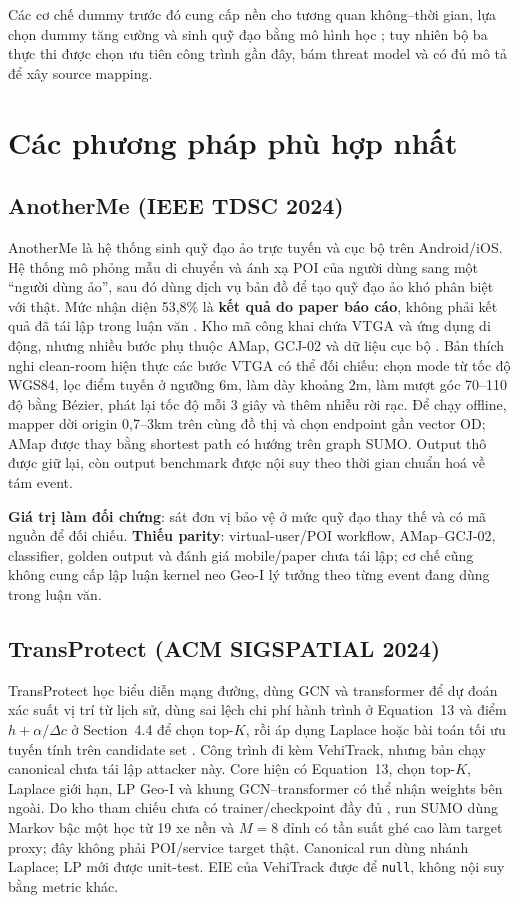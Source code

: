 \documentclass[12pt,a4paper,oneside]{report}
\begin{document}
Các cơ chế dummy trước đó cung cấp nền cho tương quan không--thời gian, lựa chọn dummy tăng cường và sinh quỹ đạo bằng mô hình học \citep{liu2017dummy,parmar2023dummy,yang2023gan}; tuy nhiên bộ ba thực thi được chọn ưu tiên công trình gần đây, bám threat model và có đủ mô tả để xây source mapping.

\section{Các phương pháp phù hợp nhất}

\subsection{AnotherMe (IEEE TDSC 2024)}

AnotherMe là hệ thống sinh quỹ đạo ảo trực tuyến và cục bộ trên Android/iOS. Hệ thống mô phỏng mẫu di chuyển và ánh xạ POI của người dùng sang một ``người dùng ảo'', sau đó dùng dịch vụ bản đồ để tạo quỹ đạo ảo khó phân biệt với thật. Mức nhận diện 53,8\% là \textbf{kết quả do paper báo cáo}, không phải kết quả đã tái lập trong luận văn \citep{li2024anotherme}. Kho mã công khai chứa VTGA và ứng dụng di động, nhưng nhiều bước phụ thuộc AMap, GCJ-02 và dữ liệu cục bộ \citep{anothermecode}. Bản thích nghi clean-room hiện thực các bước VTGA có thể đối chiếu: chọn mode từ tốc độ WGS84, lọc điểm tuyến ở ngưỡng 6m, làm dày khoảng 2m, làm mượt góc 70--110 độ bằng Bézier, phát lại tốc độ mỗi 3 giây và thêm nhiễu rời rạc. Để chạy offline, mapper dời origin 0,7--3km trên cùng đồ thị và chọn endpoint gần vector OD; AMap được thay bằng shortest path có hướng trên graph SUMO. Output thô được giữ lại, còn output benchmark được nội suy theo thời gian chuẩn hoá về tám event.

\textbf{Giá trị làm đối chứng}: sát đơn vị bảo vệ ở mức quỹ đạo thay thế và có mã nguồn để đối chiếu. \textbf{Thiếu parity}: virtual-user/POI workflow, AMap--GCJ-02, classifier, golden output và đánh giá mobile/paper chưa tái lập; cơ chế cũng không cung cấp lập luận kernel neo Geo-I lý tưởng theo từng event đang dùng trong luận văn.

\subsection{TransProtect (ACM SIGSPATIAL 2024)}

TransProtect học biểu diễn mạng đường, dùng GCN và transformer để dự đoán xác suất vị trí từ lịch sử, dùng sai lệch chi phí hành trình ở Equation~13 và điểm $h+\alpha/\Delta c$ ở Section~4.4 để chọn top-$K$, rồi áp dụng Laplace hoặc bài toán tối ưu tuyến tính trên candidate set \citep{yadav2024transprotect}. Công trình đi kèm VehiTrack, nhưng bản chạy canonical chưa tái lập attacker này. Core hiện có Equation~13, chọn top-$K$, Laplace giới hạn, LP Geo-I và khung GCN--transformer có thể nhận weights bên ngoài. Do kho tham chiếu chưa có trainer/checkpoint đầy đủ \citep{vehitrackcode}, run SUMO dùng Markov bậc một học từ 19 xe nền và $M=8$ đỉnh có tần suất ghé cao làm target proxy; đây không phải POI/service target thật. Canonical run dùng nhánh Laplace; LP mới được unit-test. EIE của VehiTrack được để \texttt{null}, không nội suy bằng metric khác.
\end{document}
